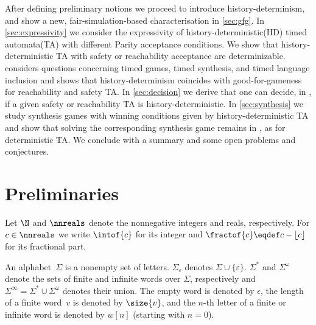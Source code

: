 \medskip
{}
After defining preliminary notions we proceed to introduce history-determinism,
and show a new, fair-simulation-based characterisation in \cref{sec:gfg}.
In \cref{sec:expressivity} we consider the expressivity of history-deterministic(HD) timed automata(TA) with different Parity acceptance conditions.
We show that history-deterministic TA with safety or reachability acceptance are determinizable.
considers questions concerning timed games, timed synthesis, and timed language inclusion
and shows that history-determinism coincides with good-for-gameness for reachability and safety TA.
In \cref{sec:decision} we derive that one can decide, in \EXPTIME, if a given safety or reachability TA is history-deterministic.
In \cref{sec:synthesis} we study synthesis games with winning conditions given by history-deterministic TA 
and show that solving the corresponding synthesis game remains in \EXPTIME, as for deterministic TA.
We conclude with a summary and some open problems and conjectures.
	
	\section{Preliminaries}
	\label{sec:definitions}
Let $\N$ and $\nnreals$ denote the nonnegative integers and reals, respectively. 
For $c\in\nnreals$ we write
$\intof{c}$ %
for its integer
and $\fractof{c} \eqdef c-\lfloor{c}\rfloor$
for its fractional part.

An alphabet~$\Sigma$ is a nonempty set of letters. $\Sigma_{\varepsilon}$ denotes $\Sigma\cup \{\varepsilon\}$.  $\Sigma^*$ and $\Sigma^\omega$ denote the sets of finite and infinite words over $\Sigma$, respectively and $\Sigma^\infty=\Sigma^*\cup \Sigma^\omega$ denotes their union.
The  empty word is denoted by $\epsilon$, the length of a finite word~$v$ is denoted by $\size{v}$, and the $n$-th letter of a finite or infinite word is denoted by $w[n]$ (starting with $n = 0$).


